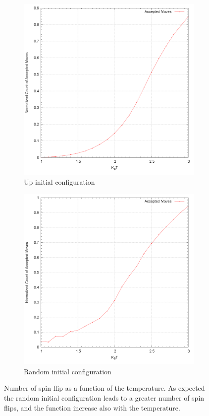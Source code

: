 \documentclass[10pt,a4paper,titlepage]{article}
\begin{document}
\begin{figure}[H]
\centering
\begin{subfigure}{.42\textwidth}
  \centering
  \includegraphics[width=.8\linewidth]{Flip_Counts_Up}
  \caption{{\footnotesize Up initial configuration}}
  \label{fig:sfig1}
\end{subfigure}%
\begin{subfigure}{.42\textwidth}
  \centering
  \includegraphics[width=.8\linewidth]{Flip_Counts_Rand}
  \caption{{\footnotesize Random initial configuration}}
  \label{fig:sfig2}
\end{subfigure}
\caption{{\footnotesize Number of spin flip as a function of the temperature. As expected the random initial configuration leads to a greater number of spin flips, and the function increase also with the temperature.}}
\label{fig:fig}
\end{figure}
\end{document}
